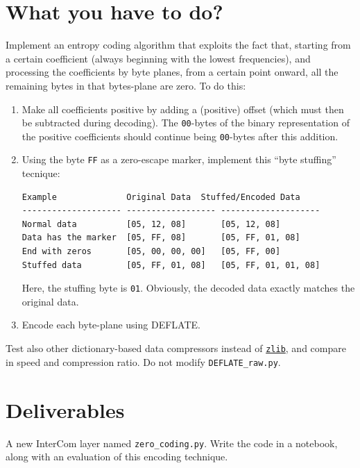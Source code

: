 \section{What you have to do?}

Implement an entropy coding algorithm that exploits the fact that,
starting from a certain coefficient (always beginning with the lowest
frequencies), and processing the coefficients by byte planes, from a
certain point onward, all the remaining bytes in that bytes-plane are
zero. To do this:

\begin{enumerate}
\item Make all coefficients positive by adding a (positive) offset
  (which must then be subtracted during decoding). The
  \texttt{00}-bytes of the binary representation of the positive
  coefficients should continue being \texttt{00}-bytes after this
  addition.
\item Using the byte \texttt{FF} as a zero-escape marker, implement this
  ``byte stuffing'' tecnique:
\begin{verbatim}
Example	             Original Data	Stuffed/Encoded Data
-------------------- ------------------ --------------------
Normal data          [05, 12, 08]       [05, 12, 08]
Data has the marker  [05, FF, 08]       [05, FF, 01, 08]
End with zeros       [05, 00, 00, 00]   [05, FF, 00]
Stuffed data         [05, FF, 01, 08]   [05, FF, 01, 01, 08]
\end{verbatim}
Here, the stuffing byte is \texttt{01}. Obviously, the decoded data
exactly matches the original data.
\item Encode each byte-plane using DEFLATE.
\end{enumerate}

Test also other dictionary-based data compressors instead of
\href{https://docs.python.org/3/library/zlib.html}{\texttt{zlib}}, and
  compare in speed and compression ratio. Do not modify
  \verb|DEFLATE_raw.py|.

\section{Deliverables}

A new InterCom layer named \verb|zero_coding.py|. Write the code in a
notebook, along with an evaluation of this encoding technique.

